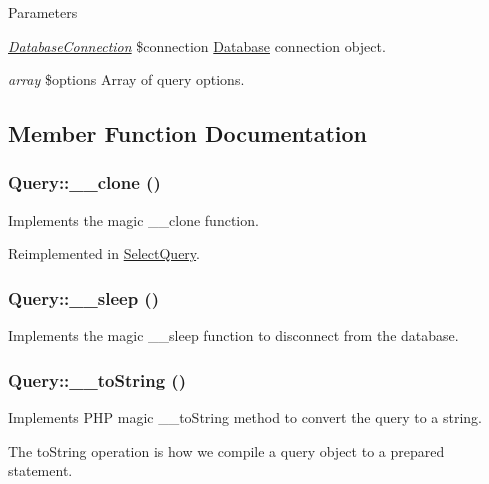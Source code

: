 \begin{DoxyParams}{Parameters}
\item[{\em \hyperlink{classDatabaseConnection}{DatabaseConnection}}]\$connection \hyperlink{classDatabase}{Database} connection object. \item[{\em array}]\$options Array of query options. \end{DoxyParams}


\subsection{Member Function Documentation}
\hypertarget{classQuery_a2a0fc84cd8f0b0ffd268de81ac2472c3}{
\subsubsection[{\_\-\_\-clone}]{\setlength{\rightskip}{0pt plus 5cm}Query::\_\-\_\-clone ()}}
\label{classQuery_a2a0fc84cd8f0b0ffd268de81ac2472c3}
Implements the magic \_\-\_\-clone function. 

Reimplemented in \hyperlink{classSelectQuery_a4a73a8d52451d193b53192e478a88161}{SelectQuery}.\hypertarget{classQuery_ab98e075cab6448bdade84475771210c4}{
\subsubsection[{\_\-\_\-sleep}]{\setlength{\rightskip}{0pt plus 5cm}Query::\_\-\_\-sleep ()}}
\label{classQuery_ab98e075cab6448bdade84475771210c4}
Implements the magic \_\-\_\-sleep function to disconnect from the database. \hypertarget{classQuery_a16c3a3265666b784d49ce18a6fda9a8a}{
\subsubsection[{\_\-\_\-toString}]{\setlength{\rightskip}{0pt plus 5cm}Query::\_\-\_\-toString ()}}
\label{classQuery_a16c3a3265666b784d49ce18a6fda9a8a}
Implements PHP magic \_\-\_\-toString method to convert the query to a string.

The toString operation is how we compile a query object to a prepared statement.

